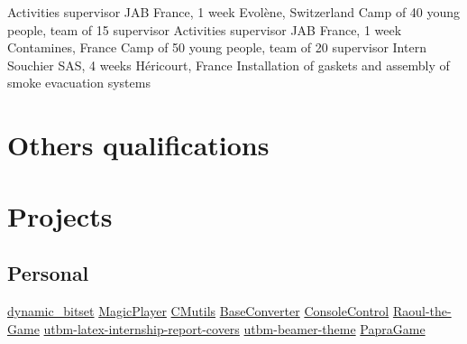\documentclass[a4paper,10pt,sans]{moderncv}
\begin{document}
			\vspace{5pt}
			{Activities supervisor}
			{JAB France, 1 week}
			{Evolène, Switzerland}
			{Camp of 40 young people, team of 15 supervisor}
			{}
			{Activities supervisor}
			{JAB France, 1 week}
			{Contamines, France}
			{Camp of 50 young people, team of 20 supervisor}
			{}
			{Intern}
			{Souchier SAS, 4 weeks}
			{Héricourt, France}
			{Installation of gaskets and assembly of smoke evacuation systems}
			{}

	\newpage


	\section{Others qualifications}


	\vspace*{\deletedSpace}
	\section{Projects}
		\subsection{Personal}
				{\href{https://github.com/pinam45/dynamic_bitset}{dynamic\_bitset}}
				{\href{https://github.com/pinam45/MagicPlayer}{MagicPlayer}}
				{\href{https://github.com/pinam45/CMutils}{CMutils}}
				{\href{https://github.com/pinam45/BaseConverter}{BaseConverter}}
				{\href{https://github.com/pinam45/ConsoleControl}{ConsoleControl}}
				{\href{https://github.com/TiWinDeTea/Raoul-the-Game}{Raoul-the-Game}}
				{\href{https://github.com/pinam45/utbm-latex-internship-report-covers}{utbm-latex-internship-report-covers}}
				{\href{https://github.com/pinam45/utbm-beamer-theme}{utbm-beamer-theme}}
				{\href{https://github.com/TiWinDeTea/PapraGame}{PapraGame}}
\end{document}
